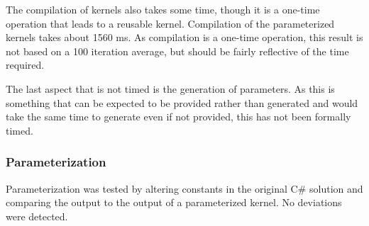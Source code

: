 The compilation of kernels also takes some time, though it is a one-time operation that leads to a reusable kernel.
Compilation of the parameterized kernels takes about 1560 ms.
As compilation is a one-time operation, this result is not based on a 100 iteration average, but should be fairly reflective of the time required.

The last aspect that is not timed is the generation of parameters.
As this is something that can be expected to be provided rather than generated and would take the same time to generate even if not provided, this has not been formally timed.

\subsubsection{Parameterization}
Parameterization was tested by altering constants in the original C\# solution and comparing the output to the output of a parameterized kernel. 
No deviations were detected.